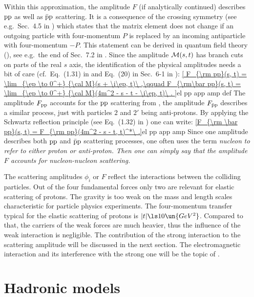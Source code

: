 Within this approximation, the amplitude $F$ (if analytically continued) describes $\rm pp$ as well as $\rm \bar pp$ scattering. It is a consequence of the crossing symmetry (see e.g.~Sec.~4.5 in ) which states that the matrix element does not change if an outgoing particle with four-momentum $P$ is replaced by an incoming antiparticle with four-momentum $-P$. This statement can be derived in quantum field theory (), see e.g.~the end of Sec.~7.2 in . Since the  amplitude ${\cal M}(s, t)$ has branch cuts on parts of the real $s$ axis, the identification of the physical amplitudes needs a bit of care (cf.~Eq.~(1.31) in  and Eq.~(20) in Sec.~6-1 in ):
\eqref{
	F_{\rm pp}(s, t) = \lim_{\ep \to 0^+} {\cal M}(s + \i\ep, t)\ ,\qquad
	F_{\rm\bar pp}(s, t) = \lim_{\ep \to 0^+} {\cal M}(4m^2 - s - t - \i\ep, t)\ .
}{el pp app amp def}
The amplitude $F_{\rm pp}$ accounts for the $\rm pp$ scattering from , the amplitude $F_{\rm\bar pp}$ describes a similar process, just with particles $2$ and $2'$ being anti-protons. By applying the Schwartz reflection principle (see Eq.~(1.32) in ) one can write:
\eqref{F_{\rm \bar pp}(s, t) = F_{\rm pp}(4m^2 - s - t, t)^*\ .}{el pp app amp}
Since one amplitude describes both $\rm pp$ and $\rm\bar pp$ scattering processes, one often uses the term \em{nucleon} to refer to either proton or anti-proton. Then one can simply say that the amplitude $F$ accounts for nucleon-nucleon scattering.

The scattering amplitudes $\phi_i$ or $F$ reflect the interactions between the colliding particles. Out of the four fundamental forces only two are relevant for elastic scattering of protons. The gravity is too weak on the mass and length scales characteristic for particle physics experiments. The four-momentum transfer typical for the elastic scattering of protons is $|t| \ls 10\un{GeV^2}$. Compared to that, the carriers of the weak forces are much heavier, thus the influence of the weak interaction is negligible. The contribution of the strong interaction to the scattering amplitude will be discussed in the next section. The electromagnetic interaction and its interference with the strong one will be the topic of .

\section[el models]{Hadronic models}

